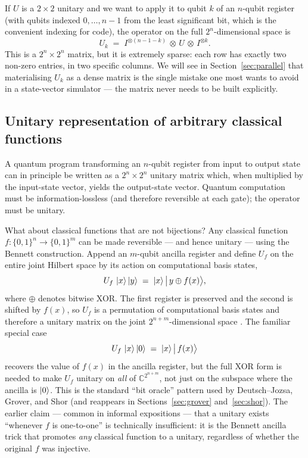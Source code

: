 If $U$ is a $2\times 2$ unitary and we want to apply it to qubit $k$ of an $n$-qubit register (with qubits indexed $0,\ldots,n-1$ from the least significant bit, which is the convenient indexing for code), the operator on the full $2^n$-dimensional space is
\begin{equation}
U_k \;=\; I^{\otimes(n-1-k)} \,\otimes\, U \,\otimes\, I^{\otimes k}.
\label{eq:single-qubit-on-register}
\end{equation}
This is a $2^n \times 2^n$ matrix, but it is extremely sparse: each row has exactly two non-zero entries, in two specific columns. We will see in Section~\ref{sec:parallel} that materialising $U_k$ as a dense matrix is the single mistake one most wants to avoid in a state-vector simulator --- the matrix never needs to be built explicitly.

\subsection{Unitary representation of arbitrary classical functions}

A quantum program transforming an $n$-qubit register from input to output state can in principle be written as a $2^n \times 2^n$ unitary matrix which, when multiplied by the input-state vector, yields the output-state vector. Quantum computation must be information-lossless (and therefore reversible at each gate); the operator must be unitary.

What about classical functions that are not bijections? Any classical function $f:\{0,1\}^n \to \{0,1\}^m$ can be made reversible --- and hence unitary --- using the Bennett construction. Append an $m$-qubit ancilla register and define $U_f$ on the entire joint Hilbert space by its action on computational basis states,
\begin{equation}
U_f\, \mathinner{|{x}\rangle}\mathinner{|{y}\rangle} \;=\; \mathinner{|{x}\rangle}\bigl|\,y \oplus f(x)\bigr\rangle,
\label{eq:bennett-xor}
\end{equation}
where $\oplus$ denotes bitwise XOR. The first register is preserved and the second is shifted by $f(x)$, so $U_f$ is a permutation of computational basis states and therefore a unitary matrix on the joint $2^{n+m}$-dimensional space \cite{bennett1973}. The familiar special case
\begin{equation*}
U_f\, \mathinner{|{x}\rangle}\mathinner{|{0}\rangle} \;=\; \mathinner{|{x}\rangle}\bigl|\,f(x)\bigr\rangle
\end{equation*}
recovers the value of $f(x)$ in the ancilla register, but the full XOR form is needed to make $U_f$ unitary on \emph{all} of $\mathbb{C}^{2^{n+m}}$, not just on the subspace where the ancilla is $\mathinner{|{0}\rangle}$. This is the standard ``bit oracle'' pattern used by Deutsch--Jozsa, Grover, and Shor (and reappears in Sections~\ref{sec:grover} and~\ref{sec:shor}). The earlier claim --- common in informal expositions --- that a unitary exists ``whenever $f$ is one-to-one'' is technically insufficient: it is the Bennett ancilla trick that promotes \emph{any} classical function to a unitary, regardless of whether the original $f$ was injective.


